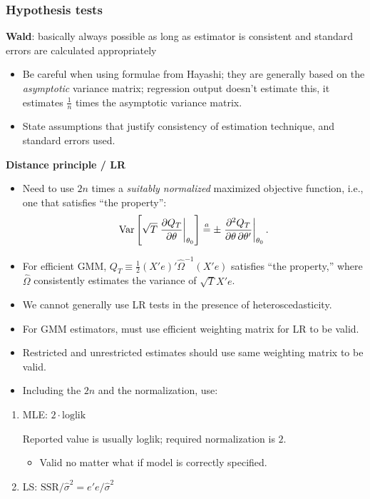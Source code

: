 \documentclass[8pt,letterpaper, landscape]{extarticle} %
\begin{document}
\begin{multicols}{3}
\begin{description}
\subsubsection*{Hypothesis tests}
\textbf{Wald}: basically always possible as long as estimator is consistent and standard errors are calculated appropriately
\begin{itemize}
\item Be careful when using formulae from Hayashi; they are generally based on the \textit{asymptotic} variance matrix; regression output doesn't estimate this, it estimates $ \frac{1}{n} $ times the asymptotic variance matrix.
\item State assumptions that justify consistency of estimation technique, and standard errors used.
\end{itemize}
\textbf{Distance principle / LR}
\begin{itemize}
\item Need to use $ 2n $ times a \textit{suitably normalized} maximized objective function, i.e., one that satisfies ``the property'':
\[ \operatorname{Var} \left[ \sqrt{T} \left. \frac{\partial Q_T}{\partial \theta} \right|_{\theta_0}  \right] \stackrel{a}{=} \pm \left. \frac{\partial^2 Q_T}{\partial \theta \, \partial \theta'} \right|_{\theta_0} . \]
\item For efficient GMM, $ Q_T \equiv \tfrac{1}{2} (X' e)' \widehat{\Omega}^{-1} (X' e) $ satisfies ``the property,'' where $ \widehat{\Omega} $ consistently estimates the variance of $ \sqrt{T} X'e $.
\item We cannot generally use LR tests in the presence of heteroscedasticity.
\item For GMM estimators, must use efficient weighting matrix for LR to be valid.
\item Restricted and unrestricted estimates should use same weighting matrix to be valid.
\item Including the $ 2n $ and the normalization, use:
\end{itemize}
\begin{enumerate}
\item MLE: $ 2 \cdot \text{loglik} $

Reported value is usually loglik; required normalization is $ 2 $.
\begin{itemize}
\item Valid no matter what if model is correctly specified.
\end{itemize}
\item LS: $ \text{SSR} / \hat{\sigma}^2 = e' e / \hat{\sigma}^2 $


\end{enumerate}
\end{description}
\end{multicols}
\end{document}
